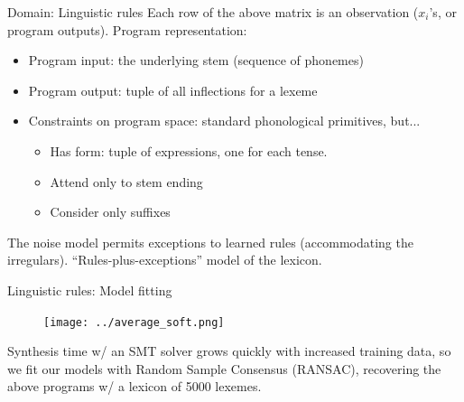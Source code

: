 \documentclass[final]{beamer}
\newlength{\onecolwid}
\begin{document}
\begin{frame}[t]
\begin{columns}[t]
\begin{column}{\onecolwid}
\begin{block}{Domain: Linguistic rules}
Each row of the above matrix is an observation ($x_i$'s, or program outputs). Program representation:
\begin{itemize}
\item Program input: the underlying stem (sequence of phonemes)
  \item Program output: tuple of all inflections for a lexeme
  \item Constraints on program space: standard phonological primitives, but...
    \begin{itemize}
    \item Has form: tuple of expressions, one for each tense.
    \item Attend only to stem ending
    \item Consider only suffixes
    \end{itemize}
  \end{itemize}

The noise model permits exceptions  to learned rules (accommodating the irregulars). ``Rules-plus-exceptions'' model of the lexicon.
\end{block}


\begin{block}{Linguistic rules: Model fitting}





  
  \begin{figure}  
\vspace{-1.5cm}\texttt{[image: ../average\_soft.png]} 
  \end{figure}
  Synthesis time w/ an SMT solver grows quickly with increased training data, so we fit our models with Random Sample Consensus (RANSAC), recovering the above programs w/ a lexicon of 5000 lexemes.


\end{block}
\end{column}
\end{columns}
\end{frame}
\end{document}
